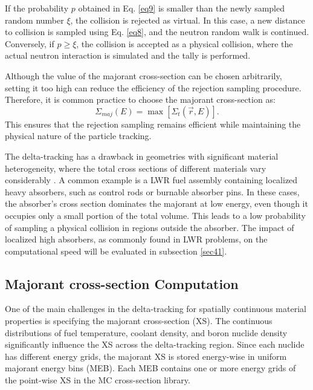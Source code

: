 If the probability $p$ obtained in Eq. \ref{eq9} is smaller than the newly sampled random number $\xi$, the collision is rejected as virtual. In this case, a new distance to collision is sampled using Eq. \ref{eq8}, and the neutron random walk is continued. Conversely, if $p \geq \xi$, the collision is accepted as a physical collision, where the actual neutron interaction is simulated and the tally is performed.

Although the value of the majorant cross-section can be chosen arbitrarily, setting it too high can reduce the efficiency of the rejection sampling procedure. Therefore, it is common practice to choose the majorant cross-section as:
\begin{equation}
    \Sigma_{maj}(E) = \max{\left[\Sigma_t(\vec{r},E)\right]}.
    \label{eq10}
\end{equation}
This ensures that the rejection sampling remains efficient while maintaining the physical nature of the particle tracking.

The delta-tracking has a drawback in geometries with significant material heterogeneity, where the total cross sections of different materials vary considerably \cite{leppanen_2010}. A common example is a LWR fuel assembly containing localized heavy absorbers, such as control rods or burnable absorber pins. In these cases, the absorber's cross section dominates the majorant at low energy, even though it occupies only a small portion of the total volume. This leads to a low probability of sampling a physical collision in regions outside the absorber. The impact of localized high absorbers, as commonly found in LWR problems, on the computational speed will be evaluated in subsection \ref{sec41}.

\subsection{Majorant cross-section Computation} \label{sec24}

One of the main challenges in the delta-tracking for spatially continuous material properties is specifying the majorant cross-section (XS). The continuous distributions of fuel temperature, coolant density, and boron nuclide density significantly influence the XS across the delta-tracking region. Since each nuclide has different energy grids, the majorant XS is stored energy-wise in uniform majorant energy bins (MEB). Each MEB contains one or more energy grids of the point-wise XS in the MC cross-section library.

